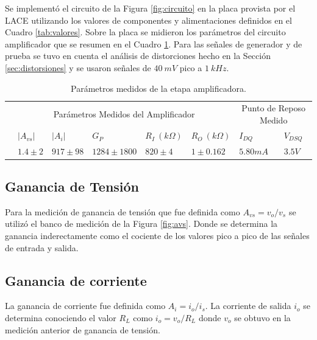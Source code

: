 \documentclass[a4paper, 10pt, spanish]{article}
\begin{document}
Se implementó el circuito de la Figura \ref{fig:circuito} en la placa provista por el LACE utilizando los valores de componentes y alimentaciones definidos en el Cuadro \ref{tab:valores}. Sobre la placa se midieron los parámetros del circuito amplificador que se resumen en el Cuadro \ref{tab:mediciones}. Para las señales de generador y de prueba se tuvo en cuenta el análisis de distorciones hecho en la Sección \ref{sec:distorsiones} y se usaron señales de $40\ mV$ pico a $1\ kHz$.


\begin{table}[h]
\centering
\begin{tabularx}{0.9\textwidth}{XXXXXXXX}
\hline
\multicolumn{1}{c}{}				& \multicolumn{5}{c}{Parámetros Medidos del Amplificador}						& \multicolumn{2}{c}{Punto de Reposo Medido} \\
									\cmidrule(r){2-6}														\cmidrule(r){7-8}
\multicolumn{1}{c}{}				& $|A_{vs}|$  		& $|A_{i}|$ 		& $G_P$ 			& $R_I\ (k\Omega)$ & $R_O\ (k\Omega)$ 		& $I_{DQ}$ 			& $V_{DSQ}$			\\
									\cmidrule(r){2-2} \cmidrule(r){3-3} \cmidrule(r){4-4} 	\cmidrule(r){5-5} 	\cmidrule(r){6-6} \cmidrule(r){7-7} 	\cmidrule(r){8-8}
\multicolumn{1}{c}{}				& $1.4 \pm 2$	& $917 \pm 98$	& $1284 \pm 1800$ & $820 \pm 4 $ & $1 \pm 0.162 $ & $5.80mA$& $3.5V$\\
\hline
\end{tabularx}
\caption{Parámetros medidos de la etapa amplificadora.}
\label{tab:mediciones}
\end{table}



\subsection{Ganancia de Tensión}



Para la medición de ganancia de tensión que fue definida como $A_{vs} = v_o/v_s$ se utilizó el banco de medición de la Figura \ref{fig:avs}. Donde se determina la ganancia inderectamente como el cociente de los valores pico a pico de las señales de entrada y salida.




\subsection{Ganancia de corriente}

La ganancia de corriente fue definida como $A_i = i_o/ i_s$. La corriente de salida $i_o$ se determina conociendo el valor $R_L$ como $i_o = v_o/R_L$ donde $v_o$ se obtuvo en la medición anterior de ganancia de tensión.
\end{document}
